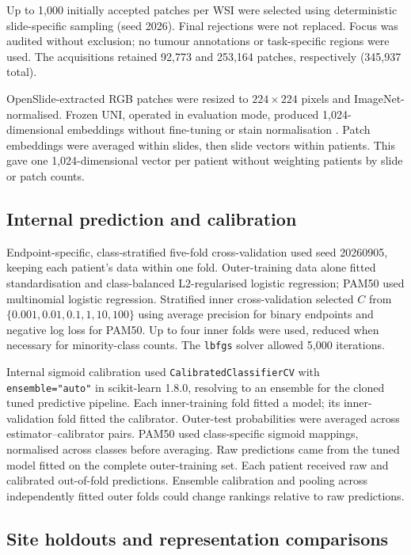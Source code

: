 \documentclass[pdflatex]{cas-dc}
\theoremstyle{remark}
\theoremstyle{plain}
\begin{document}
Up to 1,000 initially accepted patches per WSI were selected using deterministic slide-specific sampling (seed 2026). Final rejections were not replaced. Focus was audited without exclusion; no tumour annotations or task-specific regions were used. The acquisitions retained 92,773 and 253,164 patches, respectively (345,937 total).

OpenSlide-extracted RGB patches were resized to $224\times224$ pixels and ImageNet-normalised. Frozen UNI, operated in evaluation mode, produced 1,024-dimensional embeddings without fine-tuning or stain normalisation \citep{Chen2024UNI}. Patch embeddings were averaged within slides, then slide vectors within patients. This gave one 1,024-dimensional vector per patient without weighting patients by slide or patch counts.

\subsection{Internal prediction and calibration}

Endpoint-specific, class-stratified five-fold cross-validation used seed 20260905, keeping each patient's data within one fold. Outer-training data alone fitted standardisation and class-balanced L2-regularised logistic regression; PAM50 used multinomial logistic regression. Stratified inner cross-validation selected $C$ from $\{0.001,0.01,0.1,1,10,100\}$ using average precision for binary endpoints and negative log loss for PAM50. Up to four inner folds were used, reduced when necessary for minority-class counts. The \texttt{lbfgs} solver allowed 5,000 iterations.

Internal sigmoid calibration used \texttt{CalibratedClassifierCV} with \texttt{ensemble="auto"} in scikit-learn 1.8.0, resolving to an ensemble for the cloned tuned predictive pipeline. Each inner-training fold fitted a model; its inner-validation fold fitted the calibrator. Outer-test probabilities were averaged across estimator--calibrator pairs. PAM50 used class-specific sigmoid mappings, normalised across classes before averaging. Raw predictions came from the tuned model fitted on the complete outer-training set. Each patient received raw and calibrated out-of-fold predictions. Ensemble calibration and pooling across independently fitted outer folds could change rankings relative to raw predictions.

\subsection{Site holdouts and representation comparisons}
\end{document}
